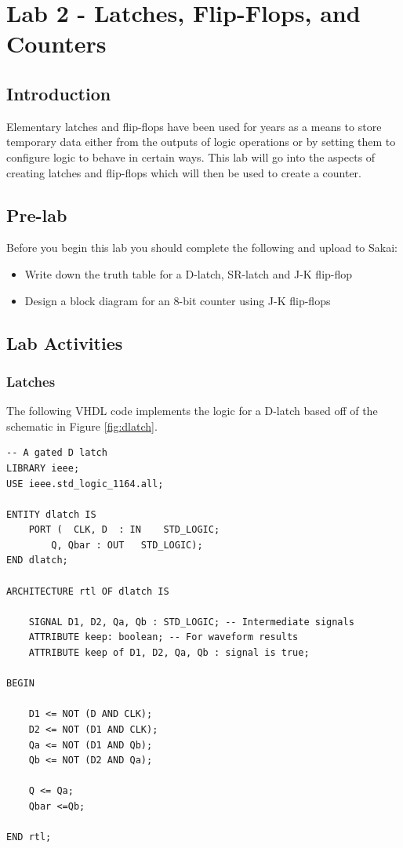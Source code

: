 \section{Lab 2 - Latches, Flip-Flops, and Counters}

\subsection{Introduction}
Elementary latches and flip-flops have been used for years as a means to store temporary data either from the outputs of logic operations or by setting them to configure logic to behave in certain ways. This lab will go into the aspects of creating latches and flip-flops which will then be used to create a counter. 

\subsection{Pre-lab}
Before you begin this lab you should complete the following and upload to Sakai:

\begin{itemize}
	\item Write down the truth table for a D-latch, SR-latch and J-K flip-flop
	\item Design a block diagram for an 8-bit counter using J-K flip-flops
\end{itemize} 

\subsection{Lab Activities}

\subsubsection{Latches}
The following VHDL code implements the logic for a D-latch based off of the schematic in Figure \ref{fig:dlatch}. 

\begin{lstlisting}
-- A gated D latch
LIBRARY ieee;
USE ieee.std_logic_1164.all;

ENTITY dlatch IS
	PORT (	CLK, D	: IN	STD_LOGIC;
		Q, Qbar	: OUT	STD_LOGIC);
END dlatch;

ARCHITECTURE rtl OF dlatch IS

	SIGNAL D1, D2, Qa, Qb : STD_LOGIC; -- Intermediate signals
	ATTRIBUTE keep: boolean; -- For waveform results
	ATTRIBUTE keep of D1, D2, Qa, Qb : signal is true;
	
BEGIN
	
	D1 <= NOT (D AND CLK);
	D2 <= NOT (D1 AND CLK);
	Qa <= NOT (D1 AND Qb);
	Qb <= NOT (D2 AND Qa);

	Q <= Qa;
	Qbar <=Qb;
	
END rtl;
\end{lstlisting}


